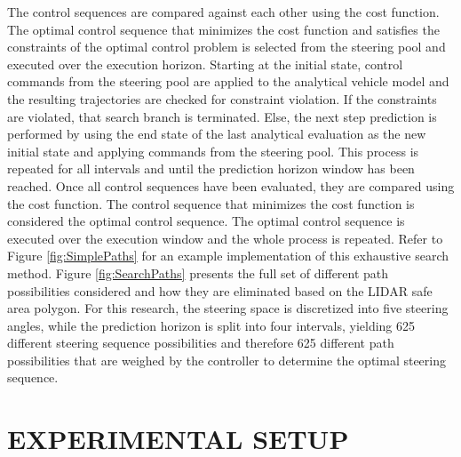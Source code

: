 \documentclass[12pt,onecolumn]{report}
\begin{document}
The control sequences are compared against each other using the cost function. The optimal control sequence that minimizes the cost function and satisfies the constraints of the optimal control problem is selected from the steering pool and executed over the execution horizon. Starting at the initial state, control commands from the steering pool are applied to the analytical vehicle model and the resulting trajectories are checked for constraint violation. If the constraints are violated, that search branch is terminated. Else, the next step prediction is performed by using the end state of the last analytical evaluation as the new initial state and applying commands from the steering pool. This process is repeated for all intervals and until the prediction horizon window has been reached. Once all control sequences have been evaluated, they are compared using the cost function. The control sequence that minimizes the cost function is considered the optimal control sequence. The optimal control sequence is executed over the execution window and the whole process is repeated. Refer to Figure \ref{fig:SimplePaths} for an example implementation of this exhaustive search method. Figure \ref{fig:SearchPaths} presents the full set of different path possibilities considered and how they are eliminated based on the LIDAR safe area polygon. For this research, the steering space is discretized into five steering angles, while the prediction horizon is split into four intervals, yielding 625 different steering sequence possibilities and therefore 625 different path possibilities that are weighed by the controller to determine the optimal steering sequence.



\chapter{EXPERIMENTAL SETUP}\label{c:ExpSetup}
\end{document}
